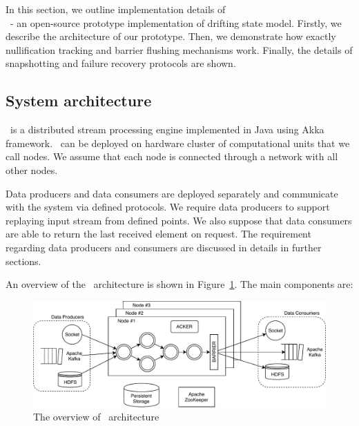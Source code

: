 
\label {fs-consistency-section}

In this section, we outline implementation details of \\ 
\FlameStream\ - an open-source prototype implementation of drifting state model. Firstly, we describe the architecture of our prototype. Then, we demonstrate how exactly nullification tracking and barrier flushing mechanisms work. Finally, the details of snapshotting and failure recovery protocols are shown. 

\subsection{System architecture}


\FlameStream\ is a distributed stream processing engine implemented in Java using Akka framework. \FlameStream\ can be deployed on hardware cluster of computational units that we call nodes. We assume that each node is connected through a network with all other nodes.

Data producers and data consumers are deployed separately and communicate with the system via defined protocols. We require data producers to support replaying input stream from defined points. We also suppose that data consumers are able to return the last received element on request. The requirement regarding data producers and consumers are discussed in details in further sections.

An overview of the \FlameStream\ architecture is shown in Figure~\ref{arch}. The main components are:

\begin{figure}[htbp]
  \centering
  \includegraphics[scale=0.78]{pics/arch}
  \caption{The overview of \FlameStream\ architecture}
  \label {arch}
\end{figure}

